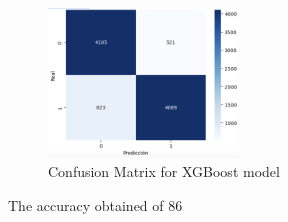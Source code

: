 \begin{figure}[H]
    \centering
    \includegraphics[width=0.45\textwidth]{images/confusion_matrix_xgboots.png} 
    \caption{Confusion Matrix for XGBoost model}
    \label{fig:confusion_matrix_xgboost}
\end{figure}

The accuracy obtained of 86%